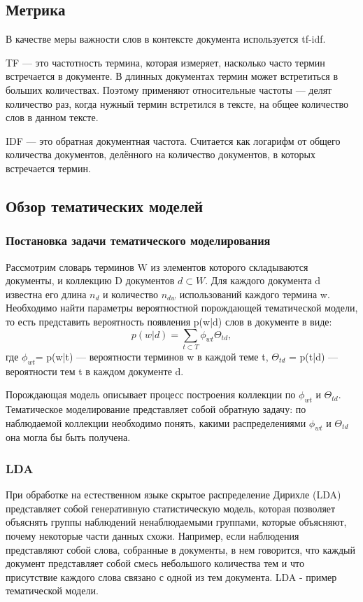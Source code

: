\documentclass{article}
\begin{document}
\subsection{Метрика}
В качестве меры важности слов в контексте документа используется tf-idf. 

TF — это частотность термина, которая измеряет, насколько часто термин встречается в документе. В длинных документах термин может встретиться в больших количествах. Поэтому применяют относительные частоты — делят количество раз, когда нужный термин встретился в тексте, на общее количество слов в данном тексте.
 
IDF — это обратная документная частота. Считается как логарифм от общего количества документов, делённого на количество документов, в которых встречается термин.

\subsection{Обзор тематических моделей}

\subsubsection{Постановка задачи тематического моделирования}
Рассмотрим  словарь терминов W из элементов которого складываются документы, и коллекцию D документов $d \subset W$.  Для каждого документа d известна его длина $n_{d}$ и количество $n_{dw}$ использований каждого термина w. Необходимо найти параметры вероятностной порождающей тематической модели, то есть представить вероятность появления p(w|d) слов в документе в виде:
\begin{equation}
p(w|d) = \sum\limits_{t \subset T} \phi_{wt}\Theta_{td}, 
\end{equation}
где $\phi_{wt}$= p(w|t) — вероятности терминов w в каждой теме t, $\Theta_{td}$ = p(t|d) — вероятности тем t в каждом документе d.

Порождающая модель описывает процесс построения коллекции по $\phi_{wt}$ и $\Theta_{td}$. Тематическое моделирование представляет собой обратную задачу: по наблюдаемой коллекции необходимо понять, какими распределениями $\phi_{wt}$ и $\Theta_{td}$ она могла бы быть получена.

\subsubsection{LDA}
При обработке на естественном языке скрытое распределение Дирихле (LDA) представляет собой генеративную статистическую модель, которая позволяет объяснять группы наблюдений ненаблюдаемыми группами, которые объясняют, почему некоторые части данных схожи. Например, если наблюдения представляют собой слова, собранные в документы, в нем говорится, что каждый документ представляет собой смесь небольшого количества тем и что присутствие каждого слова связано с одной из тем документа. LDA - пример тематической модели.
\end{document}
